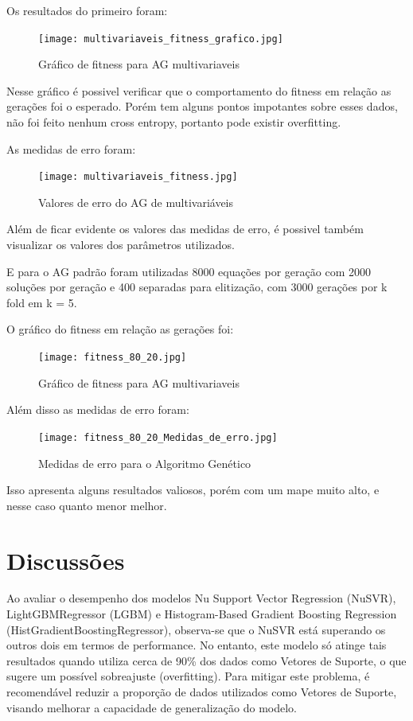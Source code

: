 \documentclass[journal]{IEEEtran}
\begin{document}
Os resultados do primeiro foram:
\begin{figure}[H]
    \centering
    \texttt{[image: multivariaveis\_fitness\_grafico.jpg]}
    \caption{Gráfico de fitness para AG multivariaveis}
    \label{fig:multi_grafico}
\end{figure}

Nesse gráfico é possivel verificar que o comportamento do fitness em relação as gerações foi o esperado. Porém tem alguns pontos impotantes sobre esses dados, não foi feito nenhum cross entropy, portanto pode existir overfitting.

As medidas de erro foram:
\begin{figure}[H]
    \centering
    \texttt{[image: multivariaveis\_fitness.jpg]}
    \caption{Valores de erro do AG de multivariáveis}
    \label{fig:multi_fit}
\end{figure}

Além de ficar evidente os valores das medidas de erro, é possivel também visualizar os valores dos parâmetros utilizados.

E para o AG padrão foram utilizadas 8000 equações por geração com 2000 soluções por geração e 400 separadas para elitização, com 3000 gerações por k fold em k = 5.

O gráfico do fitness em relação as gerações foi:
\begin{figure}[H]
    \centering
    \texttt{[image: fitness\_80\_20.jpg]}
    \caption{Gráfico de fitness para AG multivariaveis}
    \label{fig:80_20_Grafico}
\end{figure}

Além disso as medidas de erro foram:
\begin{figure}[H]
    \centering
    \texttt{[image: fitness\_80\_20\_Medidas\_de\_erro.jpg]}
    \caption{Medidas de erro para o Algoritmo Genético}
    \label{fig:fitness_80_20_Medidas_de_erro}
\end{figure}

Isso apresenta alguns resultados valiosos, porém com um mape muito alto, e nesse caso quanto menor melhor.

\section{Discussões}
Ao avaliar o desempenho dos modelos Nu Support Vector Regression (NuSVR), LightGBMRegressor (LGBM) e Histogram-Based Gradient Boosting Regression (HistGradientBoostingRegressor), observa-se que o NuSVR está superando os outros dois em termos de performance. No entanto, este modelo só atinge tais resultados quando utiliza cerca de 90\% dos dados como Vetores de Suporte, o que sugere um possível sobreajuste (overfitting). Para mitigar este problema, é recomendável reduzir a proporção de dados utilizados como Vetores de Suporte, visando melhorar a capacidade de generalização do modelo.
\end{document}
